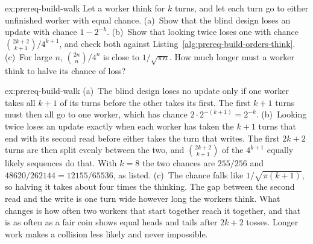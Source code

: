 \begin{pdexercise}[kind=Trace,rating=2]{ex:prereq-build-walk}
Let a worker think for $k$ turns, and let each turn go to either unfinished
worker with equal chance. (a)~Show that the blind design loses an
update with chance $1-2^{-k}$. (b)~Show that looking twice loses one with
chance $\binom{2k+2}{k+1}\big/4^{k+1}$, and check both against
Listing~\ref{alg:prereq-build-orders-think}. (c)~For large $n$,
$\binom{2n}{n}/4^{n}$ is close to $1/\sqrt{\pi n}$. How much longer must a
worker think to halve its chance of loss?
\end{pdexercise}
\begin{pdsolution}{ex:prereq-build-walk}
(a)~The blind design loses no update only if one worker takes all
$k+1$ of its turns before the other takes its first. The first $k+1$ turns
must then all go to one worker, which has chance $2\cdot2^{-(k+1)}=2^{-k}$.
(b)~Looking twice loses an update exactly when each worker has taken the
$k+1$ turns that end with its second read before either takes the turn that
writes. The first $2k+2$ turns are then split evenly between the two, and
$\binom{2k+2}{k+1}$ of the $4^{k+1}$ equally likely sequences do that. With
$k=8$ the two chances are $255/256$ and $48620/262144=12155/65536$, as
listed. (c)~The chance falls like $1/\sqrt{\pi(k+1)}$, so halving it takes
about four times the thinking. The gap between the second read and the
write is one turn wide however long the workers think. What changes is how
often two workers that start together reach it together, and that is as
often as a fair coin shows equal heads and tails after $2k+2$ tosses.
Longer work makes a collision less likely and never impossible.
\end{pdsolution}

